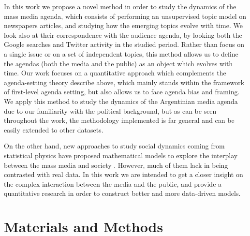 \documentclass{bmcart}
\begin{document}
\par In this work we propose a novel method in order to study the dynamics of the mass media agenda, which consists of performing an unsupervised topic model on newspapers articles, and studying how the emerging topics evolve with time. 
We look also at their correspondence with the audience agenda, by looking both the Google searches and Twitter activity in the studied period. 
Rather than focus on a single issue or on a set of independent topics, this method allows us to define  the agendas (both the media and the public) as an object which evolves with time.
Our work focuses on a quantitative approach which complements the agenda-setting theory describe above, which mainly stands within the framework of first-level agenda setting, but also allows us to face agenda bias and framing.
We apply this method to study the dynamics of the Argentinian media agenda due to our familiarity with the political background, but as can be seen throughout the work, the methodology implemented is far general and can be easily extended to other datasets. 

\par On the other hand,  new approaches to study social dynamics coming from statistical physics have proposed mathematical models to explore the interplay between the mass media and society \cite{crokidakis2012effects,gonzalez2012model, moussaid2013opinion, rodriguez2010effects, pinto2016setting}. However, much of them lack in being contrasted with real data. 
In this work we are intended to get a closer insight on the complex interaction between the media and the public, and provide a quantitative research in order to construct better and more data-driven models.

\section*{Materials and Methods}
 \label{sec:MatMeth}
\end{document}
